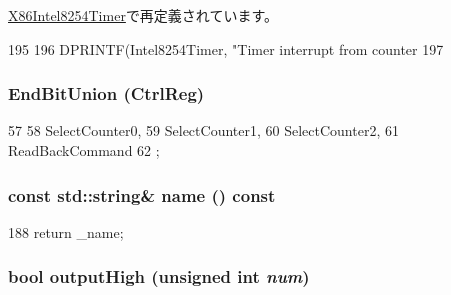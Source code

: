 \hyperlink{classX86ISA_1_1I8254_1_1X86Intel8254Timer_abe266c027cb8a03b2e1e2f08d9398679}{X86Intel8254Timer}で再定義されています。


\begin{DoxyCode}
195     {
196         DPRINTF(Intel8254Timer, "Timer interrupt from counter %
197     }
\end{DoxyCode}
\hypertarget{classIntel8254Timer_a053be9dcb79639ccf7e3554b86d8b62c}{
\subsubsection[{EndBitUnion}]{\setlength{\rightskip}{0pt plus 5cm}EndBitUnion (CtrlReg)}}
\label{classIntel8254Timer_a053be9dcb79639ccf7e3554b86d8b62c}



\begin{DoxyCode}
57                    {
58         SelectCounter0,
59         SelectCounter1,
60         SelectCounter2,
61         ReadBackCommand
62     };
\end{DoxyCode}
\hypertarget{classIntel8254Timer_a324e8c54c4c5161913681a1a52fef959}{
\subsubsection[{name}]{\setlength{\rightskip}{0pt plus 5cm}const std::string\& name () const}}
\label{classIntel8254Timer_a324e8c54c4c5161913681a1a52fef959}



\begin{DoxyCode}
188 { return _name; }
\end{DoxyCode}
\hypertarget{classIntel8254Timer_ab3ebc39ad58dd927f9da6958c45203a2}{
\subsubsection[{outputHigh}]{\setlength{\rightskip}{0pt plus 5cm}bool outputHigh (unsigned int {\em num})}}
\label{classIntel8254Timer_ab3ebc39ad58dd927f9da6958c45203a2}




